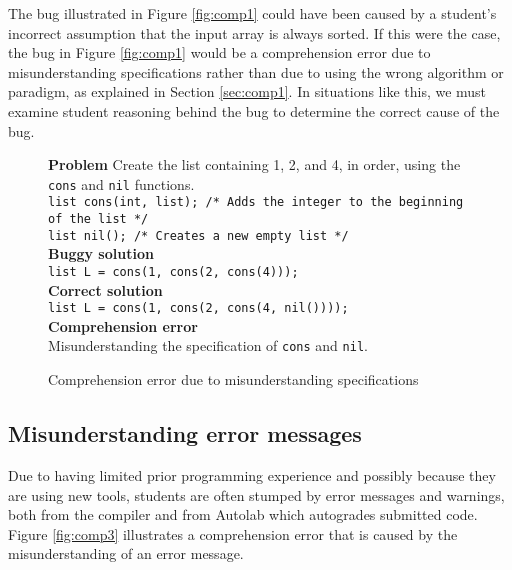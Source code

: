 \documentclass{sig-alternate}
\begin{document}
The bug illustrated in Figure \ref{fig:comp1} could have been caused by a student's incorrect assumption that the input array is always sorted. If this were the case, the bug in Figure \ref{fig:comp1} would be a comprehension error due to misunderstanding specifications rather than due to using the wrong algorithm or paradigm, as explained in Section \ref{sec:comp1}. In situations like this, we must examine student reasoning behind the bug to determine the correct cause of the bug.

\begin{figure}
\begin{framed}
\setlength{\parindent}{0cm}
\textbf{Problem}
Create the list containing 1, 2, and 4, in order, using the \texttt{cons} and \texttt{nil} functions.\\
\texttt{list cons(int, list); /* Adds the integer to the beginning of the list */\\ list nil(); /* Creates a new empty list */}\\

\textbf{Buggy solution}\\
\texttt{list L = cons(1, cons(2, cons(4)));}\\

\textbf{Correct solution}\\
\texttt{list L = cons(1, cons(2, cons(4, nil())));}\\

\textbf{Comprehension error}\\
Misunderstanding the specification of \texttt{cons} and \texttt{nil}.
\end{framed}
\caption{Comprehension error due to misunderstanding specifications}
\label{fig:comp2}
\end{figure}

\subsection{Misunderstanding error messages}
Due to having limited prior programming experience and possibly because they are using new tools, students are often stumped by error messages and warnings, both from the compiler and from Autolab which autogrades submitted code. Figure \ref{fig:comp3} illustrates a comprehension error that is caused by the misunderstanding of an error message.
\end{document}
